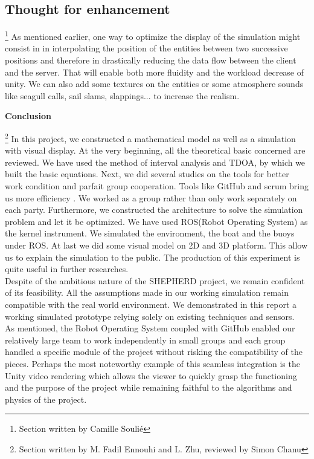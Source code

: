\documentclass[a4paper]{report}
\begin{document}
\subsection{Thought for enhancement}
\footnote{Section written by Camille Soulié}
As mentioned earlier, one way to optimize the display of the simulation might consist in in interpolating the position of the entities between two successive positions and therefore in drastically reducing the data flow between the client and the server. That will enable both more fluidity and the workload decrease of unity.
We can also add some textures on the entities or some atmosphere sounds like seagull calls, sail slams, slappings... to increase the realism.

\newpage

	\begin{center}
		\textbf{\LARGE{Conclusion}}
	\end{center}

\vspace{5cm}

\footnote{Section written by M. Fadil Ennouhi and L. Zhu, reviewed by Simon Chanu}
In this project, we constructed a mathematical model as well as a simulation with visual display. At the very beginning, all the theoretical basic concerned are reviewed. We have used the method of interval analysis and TDOA, by which we built the basic equations. Next, we did several studies on the tools for better work condition and parfait group cooperation. Tools like GitHub and scrum bring us more efficiency . We worked as a group rather than only work separately on each party. Furthermore, we constructed the architecture to solve the simulation problem and let it be optimized. We have used ROS(Robot Operating System) as the kernel instrument. We simulated the environment, the boat and the buoys under ROS. At last we did some visual model on 2D and 3D platform. This allow us to explain the simulation to the public. The production of this experiment is quite useful in further researches.\\

Despite of the ambitious nature of the SHEPHERD project, we remain confident of its feasibility. All the assumptions made in our working simulation remain compatible with the real world environment. We demonstrated in this report a working simulated prototype relying solely on existing techniques and sensors.\\

As mentioned, the Robot Operating System coupled with GitHub enabled our relatively large team to work independently in small groups and each group handled a specific module of the project without risking the compatibility of the pieces. Perhaps the most noteworthy example of this seamless integration is the Unity video rendering which allows the viewer to quickly grasp the functioning and the purpose of the project while remaining faithful to the algorithms and physics of the project.\\
\end{document}
